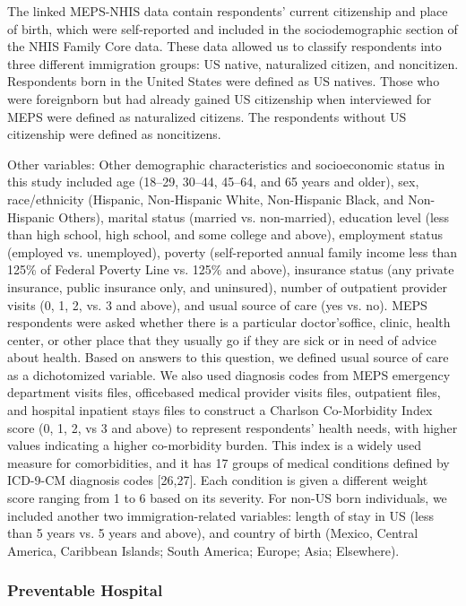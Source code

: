 \documentclass[../main.tex]{subfiles}
\begin{document}
The linked MEPS-NHIS data contain respondents' current citizenship and place of birth, which were self-reported and included in the sociodemographic section of the NHIS Family Core data. These data allowed us to classify respondents into three different immigration groups: US native, naturalized citizen, and noncitizen. Respondents born in the United States were defined as US natives. Those who were foreignborn but had already gained US citizenship when interviewed for MEPS were defined as naturalized citizens. The respondents without US citizenship were defined as noncitizens.


Other variables:
Other demographic characteristics and socioeconomic status in this study included age (18–29, 30–44, 45–64, and 65 years and older), sex, race/ethnicity (Hispanic, Non-Hispanic White, Non-Hispanic Black, and Non-Hispanic Others), marital status (married vs. non-married), education level (less than high school, high school, and some college and above), employment status (employed vs. unemployed), poverty (self-reported annual family income less than 125\% of Federal Poverty Line vs. 125\% and above), insurance status (any private insurance, public insurance only, and uninsured), number of outpatient provider visits (0, 1, 2, vs. 3 and above), and usual source of care (yes vs. no). MEPS respondents were asked whether there is a particular doctor’soffice, clinic, health center, or other place that they usually go if they are sick or in need of advice about health. Based on answers to this question, we defined usual source of care as a dichotomized variable. We also used diagnosis codes from MEPS emergency department visits files, officebased medical provider visits files, outpatient files, and hospital inpatient stays files to construct a Charlson Co-Morbidity Index score (0, 1, 2, vs 3 and above) to represent respondents' health needs, with higher values indicating a higher co-morbidity burden. This index is a widely used measure for comorbidities, and it has 17 groups of medical conditions defined by ICD-9-CM diagnosis codes [26,27]. Each condition is given a different weight score ranging from 1 to 6 based on its severity. For non-US born individuals, we included another two immigration-related variables: length of stay in US (less than 5 years vs. 5 years and above), and country of birth (Mexico, Central America, Caribbean Islands; South America; Europe; Asia; Elsewhere).

\subsubsection{Preventable Hospital}
\end{document}
